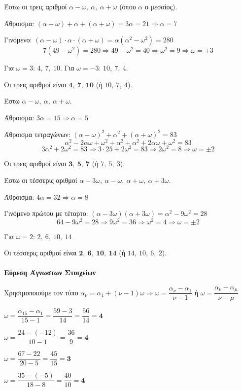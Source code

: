 \documentclass[11pt,a4paper,modern]{FFExercises}
\begin{document}
\lysh[9]
\begin{alist}
\item Έστω οι τρεις αριθμοί $\alpha-\omega,\ \alpha,\ \alpha+\omega$ (όπου $\alpha$ ο μεσαίος).

Άθροισμα: $(\alpha-\omega)+\alpha+(\alpha+\omega)=3\alpha=21 \Rightarrow \alpha=7$

Γινόμενο: $(\alpha-\omega)\cdot\alpha\cdot(\alpha+\omega)=\alpha(\alpha^2-\omega^2)=280$
$$7(49-\omega^2)=280 \Rightarrow 49-\omega^2=40 \Rightarrow \omega^2=9 \Rightarrow \omega=\pm 3$$

Για $\omega=3$: $4,\ 7,\ 10$. Για $\omega=-3$: $10,\ 7,\ 4$.

Οι τρεις αριθμοί είναι $\boldsymbol{4,\ 7,\ 10}$ (ή $10,\ 7,\ 4$).

\item Έστω $\alpha-\omega,\ \alpha,\ \alpha+\omega$.

Άθροισμα: $3\alpha=15 \Rightarrow \alpha=5$

Άθροισμα τετραγώνων: $(\alpha-\omega)^2+\alpha^2+(\alpha+\omega)^2=83$
$$\alpha^2-2\alpha\omega+\omega^2+\alpha^2+\alpha^2+2\alpha\omega+\omega^2=83$$
$$3\alpha^2+2\omega^2=83 \Rightarrow 3\cdot 25+2\omega^2=83 \Rightarrow 2\omega^2=8 \Rightarrow \omega=\pm 2$$

Οι τρεις αριθμοί είναι $\boldsymbol{3,\ 5,\ 7}$ (ή $7,\ 5,\ 3$).
\end{alist}

\lysh[10]
Έστω οι τέσσερις αριθμοί $\alpha-3\omega,\ \alpha-\omega,\ \alpha+\omega,\ \alpha+3\omega$.

Άθροισμα: $4\alpha=32 \Rightarrow \alpha=8$

Γινόμενο πρώτου με τέταρτο: $(\alpha-3\omega)(\alpha+3\omega)=\alpha^2-9\omega^2=28$
$$64-9\omega^2=28 \Rightarrow 9\omega^2=36 \Rightarrow \omega^2=4 \Rightarrow \omega=\pm 2$$

Για $\omega=2$: $2,\ 6,\ 10,\ 14$

Οι τέσσερις αριθμοί είναι $\boldsymbol{2,\ 6,\ 10,\ 14}$ (ή $14,\ 10,\ 6,\ 2$).

\paragraph{Εύρεση Άγνωστων Στοιχείων}

\lysh[11]
Χρησιμοποιούμε τον τύπο $\alpha_{\nu}=\alpha_1+(\nu-1)\omega \Rightarrow \omega=\dfrac{\alpha_{\nu}-\alpha_1}{\nu-1}$ ή $\omega=\dfrac{\alpha_{\nu}-\alpha_{\mu}}{\nu-\mu}$
\begin{alist}
\item $\omega=\dfrac{\alpha_{15}-\alpha_1}{15-1}=\dfrac{59-3}{14}=\dfrac{56}{14}=\boldsymbol{4}$

\item $\omega=\dfrac{24-(-12)}{10-1}=\dfrac{36}{9}=\boldsymbol{4}$

\item $\omega=\dfrac{67-22}{20-5}=\dfrac{45}{15}=\boldsymbol{3}$

\item $\omega=\dfrac{35-(-5)}{18-8}=\dfrac{40}{10}=\boldsymbol{4}$
\end{alist}
\end{document}
